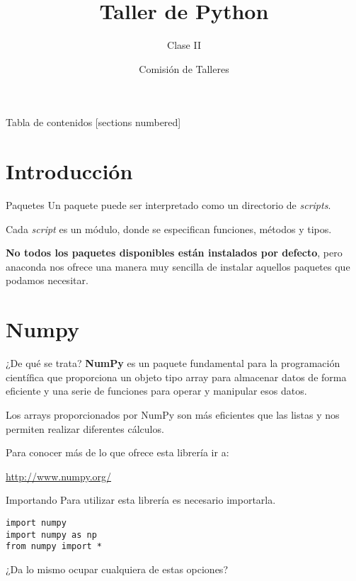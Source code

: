 \documentclass[10pt]{beamer}
\title{Taller de Python}
\subtitle{Clase II}
\date{}
\author{Comisión de Talleres}
\institute{Centro de Estudiantes Tecnológicos}
\begin{document}
\maketitle

\begin{frame}{Tabla de contenidos}
  [sections numbered]
  \tableofcontents[hideallsubsections]
\end{frame}
\section{Introducción}
\begin{frame}{Paquetes}
	Un \alert{paquete} puede ser interpretado como un directorio de \emph{scripts}.
	
	\vspace{1em}
	
	Cada \emph{script} es un \alert{módulo}, donde se especifican funciones, métodos y tipos.
	
    \vspace{1em}

	\textbf{No todos los paquetes disponibles están instalados por defecto}, pero anaconda nos ofrece una manera muy sencilla de instalar  aquellos paquetes que podamos necesitar.
\end{frame}
\section{Numpy}
\begin{frame}{¿De qué se trata?}
\textbf{NumPy} es un paquete fundamental para la programación científica que proporciona un objeto tipo \alert{array} para almacenar datos de forma eficiente y una serie de funciones para operar y manipular esos datos. 

Los arrays proporcionados por NumPy son más eficientes que las listas y nos permiten realizar diferentes cálculos.

Para conocer más de lo que ofrece esta librería ir a:

\begin{center}
	\url{http://www.numpy.org/}
\end{center}
\end{frame}

\begin{frame}[fragile]{Importando}
Para utilizar esta librería es necesario importarla.
\begin{verbatim}
import numpy
import numpy as np 
from numpy import * 
\end{verbatim}
\begin{center}
	¿Da lo mismo ocupar cualquiera de estas opciones?
\end{center}
\end{frame}
\end{document}
